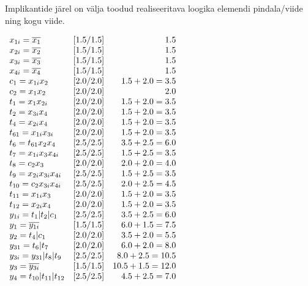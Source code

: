 \pagebreak

Implikantide järel on välja toodud realiseeritava loogika elemendi pindala/viide ning kogu viide.

\(\begin{array}{l r r}
x_{1i} = \mathop{\overline{x_1}} & [1.5/1.5] & 1.5\\
x_{2i} = \mathop{\overline{x_2}} & [1.5/1.5] & 1.5 \\
x_{3i} = \mathop{\overline{x_3}} & [1.5/1.5] & 1.5 \\
x_{4i} = \mathop{\overline{x_4}} & [1.5/1.5] & 1.5 \\

c_1 = x_{1i} x_2  & [2.0/2.0] & 1.5+2.0=3.5\\
c_2 = x_1 x_2 & [2.0/2.0] & 2.0\\ 

t_1 = x_1 x_{2i} & [2.0/2.0] & 1.5+2.0=3.5\\
t_2 = x_{3i} x_4 & [2.0/2.0] & 1.5+2.0=3.5\\
t_4 = x_{2i} x_4 & [2.0/2.0] & 1.5+2.0=3.5\\
t_{61} = x_{1i} x_{3i} & [2.0/2.0] & 1.5+2.0=3.5\\
t_6 = t_{61} x_2 x_4 & [2.5/2.5] & 3.5+2.5=6.0\\
t_7 = x_{1i} x_3 x_{4i} & [2.5/2.5] & 1.5+2.5=3.5\\ 
t_8 = c_2 x_3 & [2.0/2.0] & 2.0+2.0=4.0\\
t_9 = x_{2i} x_{3i} x_{4i} & [2.5/2.5] & 1.5+2.5=3.5 \\
t_{10} = c_2 x_{3i} x_{4i} & [2.5/2.5] & 2.0+2.5=4.5\\
t_{11} = x_{1i} x_3 & [2.0/2.0] & 1.5+2.0=3.5\\
t_{12} = x_{2i} x_4 & [2.0/2.0] & 1.5+2.0=3.5 \\
y_{1i} = t_1 | t_2 | c_1 & [2.5/2.5] & 3.5+2.5=6.0 \\
y_1 = \mathop{\overline{y_{1i}}} & [1.5/1.5] & 6.0+1.5=7.5 \\
y_2 = t_4 | c_1 & [2.0/2.0] & 3.5+2.0=5.5\\ 
y_{31} = t_6 | t_7 & [2.0/2.0] & 6.0+2.0=8.0\\
y_{3i} = y_{31} | t_8 | t_9 & [2.5/2.5] & 8.0+2.5=10.5 \\
y_3 = \mathop{\overline{y_{3i}}} & [1.5/1.5] & 10.5+1.5=12.0\\
y_4 = t_{10} | t_{11} | t_{12} & [2.5/2.5] & 4.5+2.5=7.0\\
\end{array}\)

